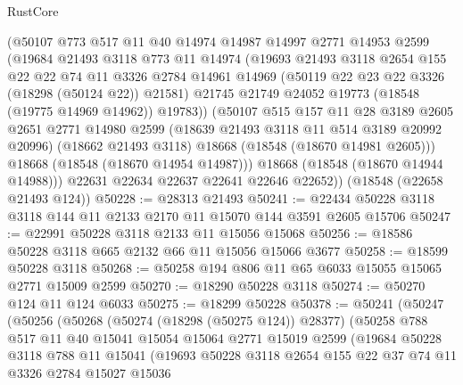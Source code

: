 \begin{lexlean}{RustCore}
\begin{coremodule}
          (@50107
            @773
            @517
            @11
            @40
            @14974
            @14987
            @14997
            @2771
            @14953
            @2599
            (@19684
              @21493
              @3118
              @773
              @11
              @14974
              (@19693
                @21493
                @3118
                @2654
                @155
                @22
                @22
                @74
                @11
                @3326
                @2784
                @14961
                @14969
                (@50119 @22 @23 @22 @3326 (@18298 (@50124 @22)) @21581)
                @21745
                @21749
                @24052
                @19773
                (@18548 (@19775 @14969 @14962))
                @19783))
            (@50107
              @515
              @157
              @11
              @28
              @3189
              @2605
              @2651
              @2771
              @14980
              @2599
              (@18639 @21493 @3118 @11 @514 @3189 @20992 @20996)
              (@18662 @21493 @3118)
              @18668
              (@18548 (@18670 @14981 @2605)))
            @18668
            (@18548 (@18670 @14954 @14987)))
          @18668
          (@18548 (@18670 @14944 @14988)))
        @22631
        @22634
        @22637
        @22641
        @22646
        @22652))
    (@18548 (@22658 @21493 @124))
@50228 := @28313 @21493
@50241 := @22434 @50228 @3118 @3118 @144 @11 @2133 @2170 @11 @15070 @144 @3591 @2605 @15706
@50247 := @22991 @50228 @3118 @2133 @11 @15056 @15068
@50256 := @18586 @50228 @3118 @665 @2132 @66 @11 @15056 @15066 @3677
@50258 := @18599 @50228 @3118
@50268 := @50258 @194 @806 @11 @65 @6033 @15055 @15065 @2771 @15009 @2599
@50270 := @18290 @50228 @3118
@50274 := @50270 @124 @11 @124 @6033
@50275 := @18299 @50228
@50378 := @50241
    (@50247
      (@50256
        (@50268
          (@50274 (@18298 (@50275 @124)) @28377)
          (@50258
            @788
            @517
            @11
            @40
            @15041
            @15054
            @15064
            @2771
            @15019
            @2599
            (@19684
              @50228
              @3118
              @788
              @11
              @15041
              (@19693
                @50228
                @3118
                @2654
                @155
                @22
                @37
                @74
                @11
                @3326
                @2784
                @15027
                @15036

\end{coremodule}
\end{lexlean}
